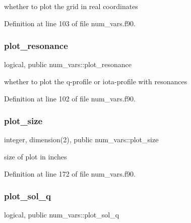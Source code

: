 whether to plot the grid in real coordinates 



Definition at line 103 of file num\+\_\+vars.\+f90.

\mbox{\label{namespacenum__vars_a70fd85a310da008203347f25b0043238}} 
\subsubsection{\texorpdfstring{plot\+\_\+resonance}{plot\_resonance}}
{\footnotesize\ttfamily logical, public num\+\_\+vars\+::plot\+\_\+resonance}



whether to plot the q-\/profile or iota-\/profile with resonances 



Definition at line 102 of file num\+\_\+vars.\+f90.

\mbox{\label{namespacenum__vars_a3bd355d04302c5d45685a0e1e3f6b1f6}} 
\subsubsection{\texorpdfstring{plot\+\_\+size}{plot\_size}}
{\footnotesize\ttfamily integer, dimension(2), public num\+\_\+vars\+::plot\+\_\+size}



size of plot in inches 



Definition at line 172 of file num\+\_\+vars.\+f90.

\mbox{\label{namespacenum__vars_a478a829f8ec3af3e57e91bf48732a5e1}} 
\subsubsection{\texorpdfstring{plot\+\_\+sol\+\_\+q}{plot\_sol\_q}}
{\footnotesize\ttfamily logical, public num\+\_\+vars\+::plot\+\_\+sol\+\_\+q}



